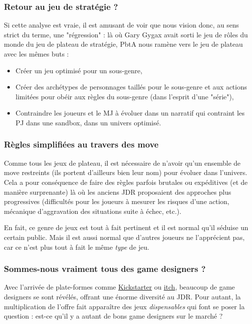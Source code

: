 \documentclass[a4paper, 11pt, twoside]{article}
\begin{document}
\subsubsection{Retour au jeu de stratégie ?}
\label{sec:org7e9f3c0}

Si cette analyse est vraie, il est amusant de voir que nous vision donc, au sens strict du terme, une "régression" : là où Gary Gygax avait sorti le jeu de rôles du monde du jeu de plateau de stratégie, PbtA nous ramène vers le jeu de plateau avec les mêmes buts :
\begin{itemize}
\item Créer un jeu optimisé pour un sous-genre,
\item Créer des archétypes de personnages taillés pour le sous-genre et aux actions limitées pour obéir aux règles du sous-genre (dans l'esprit d'une "série"),
\item Contraindre les joueurs et le MJ à évoluer dans un narratif qui contraint les PJ dans une sandbox, dans un univers optimisé.
\end{itemize}

\subsubsection{Règles simplifiées au travers des move}
\label{sec:org00123d6}

Comme tous les jeux de plateau, il est nécessaire de n'avoir qu'un ensemble de move restreints (ils portent d'ailleurs bien leur nom) pour évoluer dans l'univers. Cela a pour conséquence de faire des règles parfois brutales ou expéditives (et de manière surprenante) là où les anciens JDR proposaient des approches plus progressives (difficultés pour les joueurs à mesurer les risques d'une action, mécanique d'aggravation des situations suite à échec, etc.).

En fait, ce genre de jeux est tout à fait pertinent et il est normal qu'il séduise un certain public. Mais il est aussi normal que d'autres joueurs ne l'apprécient pas, car ce n'est plus tout à fait le même \emph{type} de jeu.

\subsubsection{Sommes-nous vraiment tous des game designers ?}
\label{sec:orgb20bcfa}

Avec l'arrivée de plate-formes comme \href{https://www.kickstarter.com}{Kickstarter} ou \href{https://itch.io}{itch}, beaucoup de game designers se sont révélés, offrant une énorme diversité au JDR. Pour autant, la multiplication de l'offre fait apparaître des jeux \emph{dispensables} qui font se poser la question : est-ce qu'il y a autant de bons game designers sur le marché ?
\end{document}
